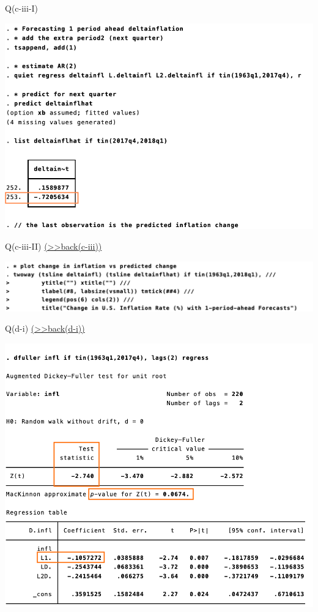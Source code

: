 \documentclass[
  10pt,
  ignorenonframetext,
]{beamer}
\begin{document}
\begin{frame}{Q(c-iii-I)}
\protect\hypertarget{qc-iii-i}{}
\begin{flushleft}\includegraphics[width=0.9\linewidth]{pictures/(ciii)forecasting} \end{flushleft}
\end{frame}

\begin{frame}{Q(c-iii-II)
\footnotesize \protect\hyperlink{Plot-forecasting-A}{(\textgreater\textgreater back(c-iii))}
\normalsize }
\protect\hypertarget{Plot-forecasting}{}
\begin{flushleft}\includegraphics[width=0.9\linewidth]{pictures/(c-iii)Plot-forecasting} \end{flushleft}
\end{frame}

\begin{frame}{Q(d-i)
\footnotesize \protect\hyperlink{ADFtest-stochastic-A}{(\textgreater\textgreater back(d-i))}
\normalsize }
\protect\hypertarget{ADFtest-stochastic}{}
\begin{flushleft}\includegraphics[width=0.7\linewidth]{pictures/(d-i)ADFtest-stochastic} \end{flushleft}
\end{frame}
\end{document}
